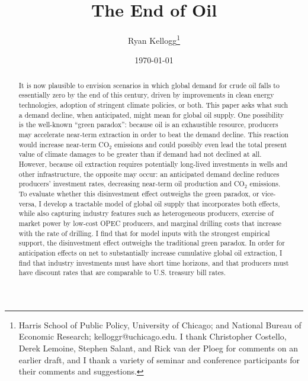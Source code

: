 \documentclass[12pt]{article}
\title{{\huge \textbf{The End of Oil}}}
\author{Ryan Kellogg\thanks{Harris School of Public Policy, University of Chicago; and National Bureau of Economic Research; kelloggr@uchicago.edu. I thank Christopher Costello, Derek Lemoine, Stephen Salant, and Rick van der Ploeg for comments on an earlier draft, and I thank a variety of seminar and conference participants for their comments and suggestions.}}
\date{\today}
\begin{document}

\maketitle

\thispagestyle{empty}	

\begin{abstract}
It is now plausible to envision scenarios in which global demand for crude oil falls to essentially zero by the end of this century, driven by improvements in clean energy technologies, adoption of stringent climate policies, or both. This paper asks what such a demand decline, when anticipated, might mean for global oil supply. One possibility is the well-known ``green paradox'': because oil is an exhaustible resource, producers may accelerate near-term extraction in order to beat the demand decline. This reaction would increase near-term CO$_2$ emissions and could possibly even lead the total present value of climate damages to be greater than if demand had not declined at all. However, because oil extraction requires potentially long-lived investments in wells and other infrastructure, the opposite may occur: an anticipated demand decline reduces producers' investment rates, decreasing near-term oil production and CO$_2$ emissions. To evaluate whether this disinvestment effect outweighs the green paradox, or vice-versa, I develop a tractable model of global oil supply that incorporates both effects, while also capturing industry features such as heterogeneous producers, exercise of market power by low-cost OPEC producers, and marginal drilling costs that increase with the rate of drilling. I find that for model inputs with the strongest empirical support, the disinvestment effect outweighs the traditional green paradox. In order for anticipation effects on net to substantially increase cumulative global oil extraction, I find that industry investments must have short time horizons, and that producers must have discount rates that are comparable to U.S. treasury bill rates.
\end{abstract}
\end{document}
